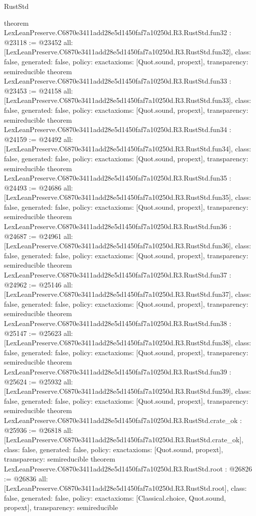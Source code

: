\begin{lexlean}{RustStd}
\begin{coremodule}
{}
theorem LexLeanPreserve.C6870e3411add28e5d1450faf7a10250d.R3.RustStd.fun32 : @23118 := @23452 {
  all: [LexLeanPreserve.C6870e3411add28e5d1450faf7a10250d.R3.RustStd.fun32],
  class: false,
  generated: false,
  policy: exact{axioms: [Quot.sound, propext]},
  transparency: semireducible
}
theorem LexLeanPreserve.C6870e3411add28e5d1450faf7a10250d.R3.RustStd.fun33 : @23453 := @24158 {
  all: [LexLeanPreserve.C6870e3411add28e5d1450faf7a10250d.R3.RustStd.fun33],
  class: false,
  generated: false,
  policy: exact{axioms: [Quot.sound, propext]},
  transparency: semireducible
}
theorem LexLeanPreserve.C6870e3411add28e5d1450faf7a10250d.R3.RustStd.fun34 : @24159 := @24492 {
  all: [LexLeanPreserve.C6870e3411add28e5d1450faf7a10250d.R3.RustStd.fun34],
  class: false,
  generated: false,
  policy: exact{axioms: [Quot.sound, propext]},
  transparency: semireducible
}
theorem LexLeanPreserve.C6870e3411add28e5d1450faf7a10250d.R3.RustStd.fun35 : @24493 := @24686 {
  all: [LexLeanPreserve.C6870e3411add28e5d1450faf7a10250d.R3.RustStd.fun35],
  class: false,
  generated: false,
  policy: exact{axioms: [Quot.sound, propext]},
  transparency: semireducible
}
theorem LexLeanPreserve.C6870e3411add28e5d1450faf7a10250d.R3.RustStd.fun36 : @24687 := @24961 {
  all: [LexLeanPreserve.C6870e3411add28e5d1450faf7a10250d.R3.RustStd.fun36],
  class: false,
  generated: false,
  policy: exact{axioms: [Quot.sound, propext]},
  transparency: semireducible
}
theorem LexLeanPreserve.C6870e3411add28e5d1450faf7a10250d.R3.RustStd.fun37 : @24962 := @25146 {
  all: [LexLeanPreserve.C6870e3411add28e5d1450faf7a10250d.R3.RustStd.fun37],
  class: false,
  generated: false,
  policy: exact{axioms: [Quot.sound, propext]},
  transparency: semireducible
}
theorem LexLeanPreserve.C6870e3411add28e5d1450faf7a10250d.R3.RustStd.fun38 : @25147 := @25623 {
  all: [LexLeanPreserve.C6870e3411add28e5d1450faf7a10250d.R3.RustStd.fun38],
  class: false,
  generated: false,
  policy: exact{axioms: [Quot.sound, propext]},
  transparency: semireducible
}
theorem LexLeanPreserve.C6870e3411add28e5d1450faf7a10250d.R3.RustStd.fun39 : @25624 := @25932 {
  all: [LexLeanPreserve.C6870e3411add28e5d1450faf7a10250d.R3.RustStd.fun39],
  class: false,
  generated: false,
  policy: exact{axioms: [Quot.sound, propext]},
  transparency: semireducible
}
theorem LexLeanPreserve.C6870e3411add28e5d1450faf7a10250d.R3.RustStd.crate_ok : @25936 := @26818 {
  all: [LexLeanPreserve.C6870e3411add28e5d1450faf7a10250d.R3.RustStd.crate_ok],
  class: false,
  generated: false,
  policy: exact{axioms: [Quot.sound, propext]},
  transparency: semireducible
}
theorem LexLeanPreserve.C6870e3411add28e5d1450faf7a10250d.R3.RustStd.root : @26826 := @26836 {
  all: [LexLeanPreserve.C6870e3411add28e5d1450faf7a10250d.R3.RustStd.root],
  class: false,
  generated: false,
  policy: exact{axioms: [Classical.choice, Quot.sound, propext]},
  transparency: semireducible
}


\end{coremodule}
\end{lexlean}
